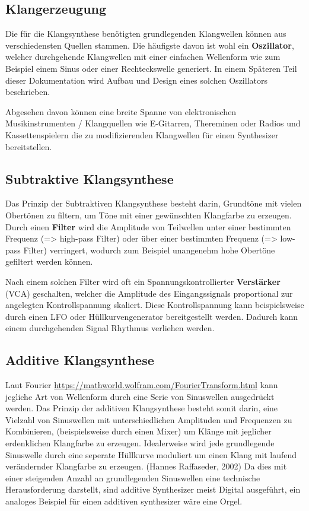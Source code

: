\subsection{Klangerzeugung}
\label{sec:org32de9f2}
Die für die Klangsynthese benötigten grundlegenden Klangwellen können aus verschiedensten Quellen stammen. Die häufigste davon ist wohl ein \textbf{Oszillator}, welcher durchgehende Klangwellen mit einer einfachen Wellenform wie zum Beispiel einem Sinus oder einer Rechteckswelle generiert. In einem Späteren Teil dieser Dokumentation wird Aufbau und Design eines solchen Oszillators beschrieben.

Abgesehen davon können eine breite Spanne von elektronischen Musikinstrumenten / Klangquellen wie E-Gitarren, Thereminen oder Radios und Kassettenspielern die zu modifizierenden Klangwellen für einen Synthesizer bereitstellen.

\subsection{Subtraktive Klangsynthese}
\label{sec:org5a834da}
Das Prinzip der Subtraktiven Klangsynthese besteht darin, Grundtöne mit vielen Obertönen zu filtern, um Töne mit einer gewünschten Klangfarbe zu erzeugen. Durch einen \textbf{Filter} wird die Amplitude von Teilwellen unter einer bestimmten Frequenz (=> high-pass Filter) oder über einer bestimmten Frequenz (=> low-pass Filter) verringert, wodurch zum Beispiel unangenehm hohe Obertöne gefiltert werden können.

Nach einem solchen Filter wird oft ein Spannungskontrollierter \textbf{Verstärker} (VCA) geschalten, welcher die Amplitude des Eingangssignals proportional zur angelegten Kontrollspannung skaliert. Diese Kontrollspannung kann beispielsweise durch einen LFO oder Hüllkurvengenerator bereitgestellt werden. Dadurch kann einem durchgehenden Signal Rhythmus verliehen werden.

\subsection{Additive Klangsynthese}
\label{sec:org49d2edd}
Laut Fourier \url{https://mathworld.wolfram.com/FourierTransform.html} kann jegliche Art von Wellenform durch eine Serie von Sinuswellen ausgedrückt werden. Das Prinzip der additiven Klangsynthese besteht somit darin, eine Vielzahl von Sinuswellen mit unterschiedlichen Amplituden und Frequenzen zu Kombinieren, (beispielsweise durch einen Mixer) um Klänge mit jeglicher erdenklichen Klangfarbe zu erzeugen. Idealerweise wird jede grundlegende Sinuswelle durch eine seperate Hüllkurve moduliert um einen Klang mit laufend verändernder Klangfarbe zu erzeugen. (Hannes Raffaseder, 2002) Da dies mit einer steigenden Anzahl an grundlegenden Sinuswellen eine technische Herausforderung darstellt, sind additive Synthesizer meist Digital ausgeführt, ein analoges Beispiel für einen additiven synthesizer wäre eine Orgel.

